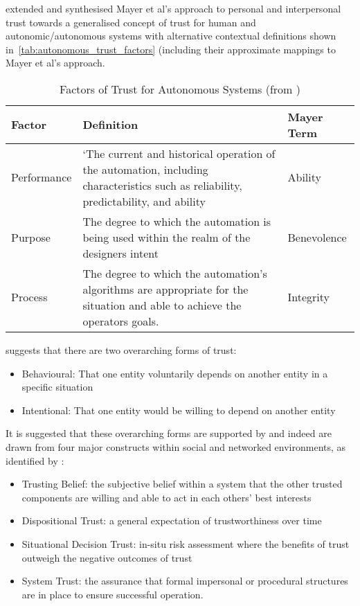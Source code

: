 
\citet{Lee2004} extended and synthesised Mayer et al's approach to personal and interpersonal trust towards a generalised concept of trust for human and autonomic/autonomous systems with alternative contextual definitions shown in~\autoref{tab:autonomous_trust_factors} (including their approximate mappings to Mayer et al's approach.

\begin{table}
  \caption[Factors of Trust for Autonomous Systems]{Factors of Trust for Autonomous Systems (from \citet{Lee2004})}
  \label{tab:autonomous_trust_factors}
  \begin{tabularx}{\textwidth}{p{2cm}X p{2cm}}\toprule
    Factor & Definition & Mayer Term\\ \midrule
    Performance & `The current and historical operation of the automation, including characteristics such as reliability, predictability, and ability & Ability\\
    Purpose & The degree to which the automation is being used within the realm of the designers intent & Benevolence \\
    Process & The degree to which the automation's algorithms are appropriate for the situation and able to achieve the operators goals.
    & Integrity\\

    \bottomrule
  \end{tabularx}
\end{table}

\citet{Sun2008} suggests that there are two overarching forms of trust:
\begin{itemize}
  \item Behavioural: That one entity voluntarily depends on another entity in a specific situation
  \item Intentional: That one entity would be willing to depend on another entity
\end{itemize}

It is suggested that these overarching forms are supported by and indeed are drawn from four major constructs within social and networked environments, as identified by \citet{Mcknight1996}:

\begin{itemize}
  \item Trusting Belief: the subjective belief within a system that the other trusted components are willing and able to act in each others' best interests
  \item Dispositional Trust: a general expectation of trustworthiness over time 
  \item Situational Decision Trust: in-situ risk assessment where the benefits of trust outweigh the negative outcomes of trust
  \item System Trust: the assurance that formal impersonal or procedural structures are in place to ensure successful operation.
\end{itemize}

